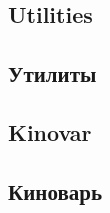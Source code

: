 \begin{EN}
\section{Utilities}
\end{EN}

\begin{RU}
\section{Утилиты}
\end{RU}

\begin{EN}
\section{Kinovar}
\subsection{}
\subsection{}
\end{EN}

\begin{RU}
\section{Киноварь}
\subsection{}
\subsection{}
\end{RU}



